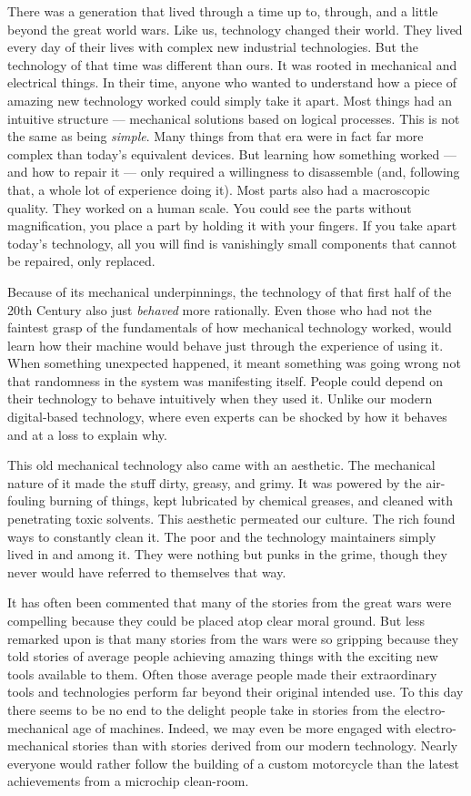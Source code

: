 \documentclass[
]{scrbook}
\begin{document}
There was a generation that lived through a time up to, through, and a
little beyond the great world wars. Like us, technology changed their
world. They lived every day of their lives with complex new industrial
technologies. But the technology of that time was different than ours.
It was rooted in mechanical and electrical things. In their time, anyone
who wanted to understand how a piece of amazing new technology worked
could simply take it apart. Most things had an intuitive structure ---
mechanical solutions based on logical processes. This is not the same as
being \emph{simple}. Many things from that era were in fact far more
complex than today's equivalent devices. But learning how something
worked --- and how to repair it --- only required a willingness to
disassemble (and, following that, a whole lot of experience doing it).
Most parts also had a macroscopic quality. They worked on a human scale.
You could see the parts without magnification, you place a part by
holding it with your fingers. If you take apart today's technology, all
you will find is vanishingly small components that cannot be repaired,
only replaced.

Because of its mechanical underpinnings, the technology of that first
half of the 20th Century also just \emph{behaved} more rationally. Even
those who had not the faintest grasp of the fundamentals of how
mechanical technology worked, would learn how their machine would behave
just through the experience of using it. When something unexpected
happened, it meant something was going wrong not that randomness in the
system was manifesting itself. People could depend on their technology
to behave intuitively when they used it. Unlike our modern digital-based
technology, where even experts can be shocked by how it behaves and at a
loss to explain why.

This old mechanical technology also came with an aesthetic. The
mechanical nature of it made the stuff dirty, greasy, and grimy. It was
powered by the air-fouling burning of things, kept lubricated by
chemical greases, and cleaned with penetrating toxic solvents. This
aesthetic permeated our culture. The rich found ways to constantly clean
it. The poor and the technology maintainers simply lived in and among
it. They were nothing but punks in the grime, though they never would
have referred to themselves that way.

It has often been commented that many of the stories from the great wars
were compelling because they could be placed atop clear moral ground.
But less remarked upon is that many stories from the wars were so
gripping because they told stories of average people achieving amazing
things with the exciting new tools available to them. Often those
average people made their extraordinary tools and technologies perform
far beyond their original intended use. To this day there seems to be no
end to the delight people take in stories from the electro-mechanical
age of machines. Indeed, we may even be more engaged with
electro-mechanical stories than with stories derived from our modern
technology. Nearly everyone would rather follow the building of a custom
motorcycle than the latest achievements from a microchip clean-room.
\end{document}

